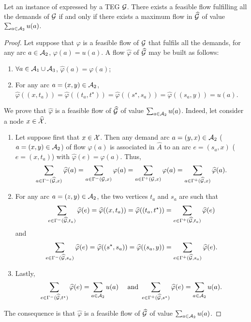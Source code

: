 \begin{bibunit}[ieeetr]
\begin{theorem}\label{theo:pol}
Let an instance of \emph{\SDPALLDEMANDS} expressed by a TEG $\mathcal{G}$.
There exists a feasible flow fulfilling all the demands of $\mathcal{G}$ if and only if there exists a maximum flow in $\widehat{\mathcal{G}}$ of value $\sum_{a\in \mathcal{A}_2} u(a)$. 
\end{theorem}
\begin{proof}
Let suppose that $\varphi$ is a feasible flow of $\mathcal{G}$ that fulfils all the demands, \ie for any arc $a \in \mathcal{A}_2$, $\varphi(a) = u(a)$.
A flow $\widehat{\varphi}$ of $\widehat{\mathcal{G}}$ may be built as follows:
\begin{enumerate}
\item
$\forall a \in \mathcal{A}_1 \cup \mathcal{A}_3$, 
$\widehat{\varphi}(a) = \varphi(a)$;
\item
For any arc $a=(x,y) \in \mathcal{A}_2$, 
$\widehat{\varphi}((x,t_a))=\widehat{\varphi}((t_a,t^\star))=\widehat{\varphi}((s^\star, s_a))=\widehat{\varphi}((s_a,y))=u(a)$.
\end{enumerate}
We prove that $\widehat{\varphi}$ is a feasible flow of $\widehat{\mathcal{G}}$ of value $\sum_{a \in \mathcal{A}_2} u(a)$. 
Indeed, let consider a node $x \in \widehat{\mathcal{X}}$.
\begin{enumerate}
\item Let suppose first that $x \in \mathcal{X}$.
Then any demand arc ${a = (y,x) \in \mathcal{A}_2}$ (\resp ${a = (x,y) \in \mathcal{A}_2}$) of flow $\varphi(a)$ is associated in $\widehat{A}$ to an
arc $e = (s_a, x)$ (\resp $e = (x, t_a)$) with ${\widehat{\varphi}(e) = \varphi(a)}$.
Thus, 
\[\sum_{a \in \Gamma^-(\widehat{\mathcal{G}}, x)} \widehat{\varphi}(a)=
\sum_{a \in \Gamma^-(\mathcal{G}, x)} \varphi(a)=\sum_{a \in \Gamma^+(\mathcal{G}, x)} \varphi(a)=
\sum_{a \in \Gamma^+(\widehat{\mathcal{G}}, x)} \widehat{\varphi}(a)\text{.}\]
\item
For any arc $a=(z,y)\in \mathcal{A}_2$, the two vertices $t_a$ and $s_a$ are such that
\[\sum_{e \in \Gamma^-(\widehat{\mathcal{G}}, t_a)} \widehat{\varphi}(e)=\widehat{\varphi}((x, t_a))=\widehat{\varphi}((t_a, t^\star))=\sum_{e \in \Gamma^+(\widehat{\mathcal{G}}, t_a)} \widehat{\varphi}(e)\]
and
\[\sum_{e \in \Gamma^-(\widehat{\mathcal{G}}, s_a)} \widehat{\varphi}(e)=\widehat{\varphi}((s^\star,s_a))=\widehat{\varphi}((s_a, y))=\sum_{e \in \Gamma^+(\widehat{\mathcal{G}}, s_a)} \widehat{\varphi}(e)\text{.}\]
\item
Lastly, \[\sum_{e \in \Gamma^-(\widehat{\mathcal{G}}, t^\star)} \widehat{\varphi}(e)=\sum_{a\in \mathcal{A}_2} u(a) \text{ ~~ and } \sum_{e \in \Gamma^+(\widehat{\mathcal{G}}, s^\star)} \widehat{\varphi}(e)=\sum_{a\in \mathcal{A}_2} u(a)\text{.}\]
\end{enumerate}
The consequence is that $\widehat\varphi$ is a feasible flow of $\widehat{\mathcal{G}}$ of value $\sum_{a\in \mathcal{A}_2} u(a)$. 


\end{proof}
\end{bibunit}
